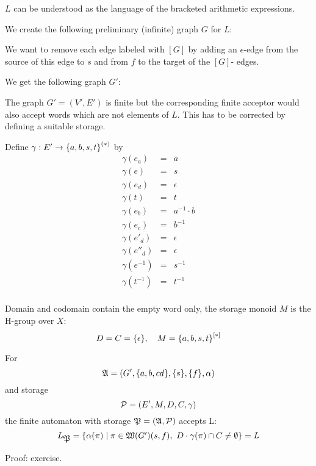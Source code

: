 $L$ can be understood as the language of the bracketed arithmetic expressions.

We create the following preliminary (infinite) graph $G$ for $L$:

\begin{center}

\end{center}

We want to remove each edge labeled with $[G]$ by adding an $\epsilon$-edge
from the source of this edge to $s$ and from $f$ to the target of the $[G]$-
edges.

We get the following graph $G'$:

\begin{center}

\end{center}

The graph $G'=(V',E')$ is finite but the corresponding finite acceptor would
also accept words which are not elements of $L$. This has to be corrected by 
defining a suitable storage.

Define $\gamma: E' \to \mbox{${\mbox{$\{a, b, s, t\}$}}^{(*)}$}$ by
\begin{eqnarray*}
\gamma(e_a) & = & a \\
\gamma(e) & = & s \\
\gamma(e_d) & = & \epsilon \\
\gamma(t) & = & t \\
\gamma(e_b) & = & a^{-1} \cdot b \\
\gamma(e_c) & = & b^{-1} \\
\gamma(e'_d) & = & \epsilon \\
\gamma(e''_d) & = & \epsilon \\
\gamma(e^{-1}) & = & s^{-1} \\
\gamma(t^{-1}) & = & t^{-1} \\
\end{eqnarray*}

Domain and codomain contain the empty word only, the storage monoid $M$ is the
H-group over $X$:
\[ D = C = \mbox{$\{\epsilon\}$},\quad M = \mbox{${\mbox{$\{a, b, s, t\}$}}^{[*]}$} \]

For
\[ \mbox{$\mathfrak{A}$} = (G', \mbox{$\{a, b,c d\}$}, \mbox{$\{s\}$}, \mbox{$\{f\}$}, \alpha) \]
and storage 
\[ \mbox{$\mathcal{P}$} = (E', M, D, C, \gamma) \]
the finite automaton with storage $\mbox{$\mathfrak{P}$} = (\mbox{$\mathfrak{A}$}, \mbox{$\mathcal{P}$})$ accepts L:
\[ L_{\mbox{$\mathfrak{P}$}} = \mbox{$\{\alpha(\pi) \mid \pi \in \mbox{$\mathfrak{W}({G'})$}(s, f),\ D \cdot
\gamma(\pi) \cap C \neq \emptyset\}$} = L \]

Proof: exercise.

